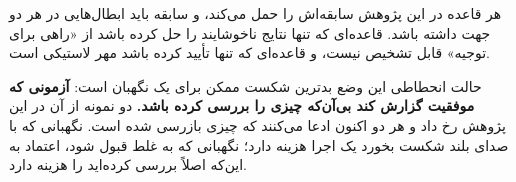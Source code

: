 هر قاعده در این پژوهش سابقه‌اش را حمل می‌کند، و سابقه باید ابطال‌هایی در هر دو جهت داشته باشد.
قاعده‌ای که تنها نتایج ناخوشایند را حل کرده باشد از «راهی برای توجیه» قابل تشخیص نیست، و
قاعده‌ای که تنها تأیید کرده باشد مهر لاستیکی است.

حالت انحطاطی این وضع بدترین شکست ممکن برای یک نگهبان است: \textbf{آزمونی که موفقیت گزارش کند
بی‌آن‌که چیزی را بررسی کرده باشد.} دو نمونه از آن در این پژوهش رخ داد و هر دو اکنون ادعا
می‌کنند که چیزی بازرسی شده است. نگهبانی که با صدای بلند شکست بخورد یک اجرا هزینه دارد؛
نگهبانی که به غلط قبول شود، اعتماد به این‌که اصلاً بررسی کرده‌اید را هزینه دارد.
